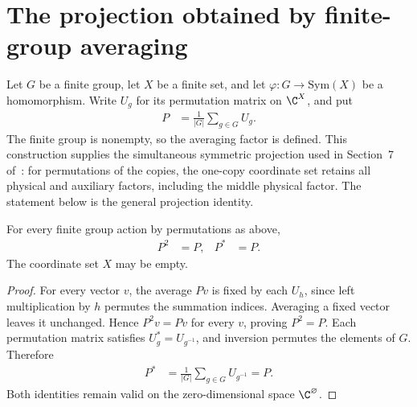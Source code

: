 \section{The projection obtained by finite-group averaging}
\label{sec:symmetric_projection}

Let $G$ be a finite group, let $X$ be a finite set, and let
$\varphi:G\to\mathrm{Sym}(X)$ be a homomorphism. Write $U_g$ for
its permutation matrix on $\C^X$, and put
\begin{align}
  P&=\frac1{|G|}\sum_{g\in G}U_g.
\end{align}
The finite group is nonempty, so the averaging factor is defined.
This construction supplies the simultaneous symmetric projection
used in Section~7 of~\cite{OpenAI2026AreaLaw}:
for permutations of the copies, the one-copy coordinate set retains
all physical and auxiliary factors, including the middle physical
factor. The statement below is the general projection identity.

\begin{theorem}
  \label{thm:symmetric_projection}
  \leanok
  For every finite group action by permutations as above,
  \begin{align}
    P^2&=P,& P^*&=P.
  \end{align}
  The coordinate set $X$ may be empty.
\end{theorem}

\begin{proof}
  \leanok
  For every vector $v$, the average $Pv$ is fixed by each $U_h$,
  since left multiplication by $h$ permutes the summation indices.
  Averaging a fixed vector leaves it unchanged. Hence $P^2v=Pv$
  for every $v$, proving $P^2=P$. Each permutation matrix satisfies
  $U_g^*=U_{g^{-1}}$, and inversion permutes the elements of $G$.
  Therefore
  \begin{align}
    P^*&=\frac1{|G|}\sum_{g\in G}U_{g^{-1}}=P.
  \end{align}
  Both identities remain valid on the zero-dimensional space
  $\C^\varnothing$.
\end{proof}
